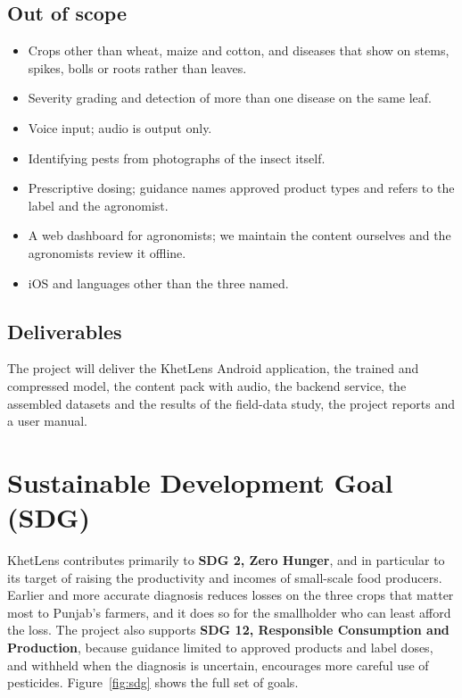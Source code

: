 \subsection{Out of scope}
\begin{itemize}
  \item Crops other than wheat, maize and cotton, and diseases that show on stems, spikes, bolls or roots rather than leaves.
  \item Severity grading and detection of more than one disease on the same leaf.
  \item Voice input; audio is output only.
  \item Identifying pests from photographs of the insect itself.
  \item Prescriptive dosing; guidance names approved product types and refers to the label and the agronomist.
  \item A web dashboard for agronomists; we maintain the content ourselves and the agronomists review it offline.
  \item iOS and languages other than the three named.
\end{itemize}

\subsection{Deliverables}
The project will deliver the KhetLens Android application, the trained and compressed model, the content pack with audio, the backend service, the assembled datasets and the results of the field-data study, the project reports and a user manual.

\section{Sustainable Development Goal (SDG)}
KhetLens contributes primarily to \textbf{SDG 2, Zero Hunger}, and in particular to its target of raising the productivity and incomes of small-scale food producers. Earlier and more accurate diagnosis reduces losses on the three crops that matter most to Punjab's farmers, and it does so for the smallholder who can least afford the loss. The project also supports \textbf{SDG 12, Responsible Consumption and Production}, because guidance limited to approved products and label doses, and withheld when the diagnosis is uncertain, encourages more careful use of pesticides. Figure~\ref{fig:sdg} shows the full set of goals.

